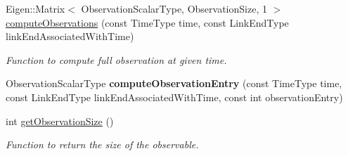 \begin{DoxyCompactItemize}
Eigen\+::\+Matrix$<$ Observation\+Scalar\+Type, Observation\+Size, 1 $>$ \hyperlink{classtudat_1_1observation__models_1_1ObservationModel_ad5af574dd94eac92c52d27f8ab123b51}{compute\+Observations} (const Time\+Type time, const Link\+End\+Type link\+End\+Associated\+With\+Time)
\begin{DoxyCompactList}\small\item\em Function to compute full observation at given time. \end{DoxyCompactList}\item 
Observation\+Scalar\+Type {\bfseries compute\+Observation\+Entry} (const Time\+Type time, const Link\+End\+Type link\+End\+Associated\+With\+Time, const int observation\+Entry)\hypertarget{classtudat_1_1observation__models_1_1ObservationModel_ac0f3cff0496214c5e3cc2a0d9499d49e}{}\label{classtudat_1_1observation__models_1_1ObservationModel_ac0f3cff0496214c5e3cc2a0d9499d49e}

\item 
int \hyperlink{classtudat_1_1observation__models_1_1ObservationModel_aac7071806c67df81660f247b6e06c413}{get\+Observation\+Size} ()
\begin{DoxyCompactList}\small\item\em Function to return the size of the observable. \end{DoxyCompactList}\end{DoxyCompactItemize}
